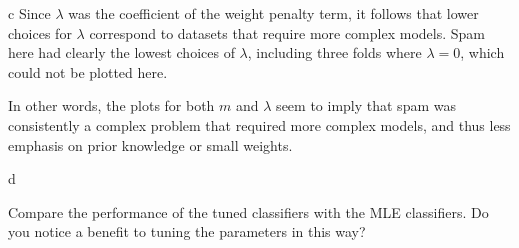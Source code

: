 \documentclass[fleqn]{homework}
\begin{document}
\begin{problem}{c}
    Since $\lambda$ was the coefficient of the weight penalty term, it follows
    that lower choices for $\lambda$ correspond to datasets that require more
    complex models.  Spam here had clearly the lowest choices of $\lambda$,
    including three folds where $\lambda=0$, which could not be plotted here.

    In other words, the plots for both $m$ and $\lambda$ seem to imply that spam
    was consistently a complex problem that required more complex models, and
    thus less emphasis on prior knowledge or small weights.
    
  \end{problem}

  \begin{problem}{d}
    \begin{question}
      Compare the performance of the tuned classifiers with the MLE classifiers.
      Do you notice a benefit to tuning the parameters in this way?
    \end{question}
  \end{problem}
\end{document}

